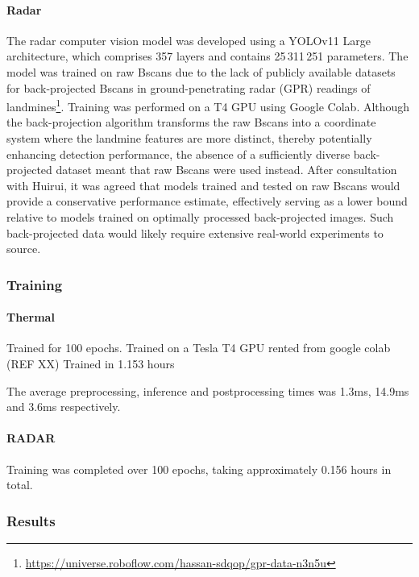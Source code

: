     \paragraph{Radar}
    
        The radar computer vision model was developed using a YOLOv11 Large architecture, which comprises 357 layers and contains 25\,311\,251 parameters. The model was trained on raw Bscans due to the lack of publicly available datasets for back-projected Bscans in ground-penetrating radar (GPR) readings of landmines\footnote{\url{https://universe.roboflow.com/hassan-sdqop/gpr-data-n3n5u}}. Training was performed on a T4 GPU using Google Colab. Although the back-projection algorithm transforms the raw Bscans into a coordinate system where the landmine features are more distinct, thereby potentially enhancing detection performance, the absence of a sufficiently diverse back-projected dataset meant that raw Bscans were used instead. After consultation with Huirui, it was agreed that models trained and tested on raw Bscans would provide a conservative performance estimate, effectively serving as a lower bound relative to models trained on optimally processed back-projected images. Such back-projected data would likely require extensive real-world experiments to source.

\subsubsection{Training}

    \paragraph{Thermal}
    
        Trained for 100 epochs.
        Trained on a Tesla T4 GPU rented from google colab (REF XX)
        Trained in 1.153 hours
    
        The average preprocessing, inference and postprocessing times was 1.3ms, 14.9ms and 3.6ms respectively.
        
    \paragraph{RADAR} 
    
        Training was completed over 100 epochs, taking approximately 0.156 hours in total. 

\subsubsection{Results}

